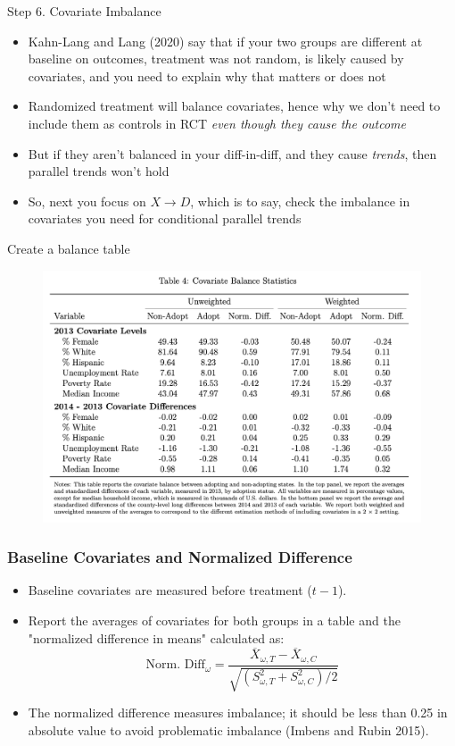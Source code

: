 \documentclass{beamer}
\begin{document}
\begin{frame}{Step 6. Covariate Imbalance}
    \begin{itemize}
	\item Kahn-Lang and Lang (2020) say that if your two groups are different at baseline on outcomes, treatment was not random, is likely caused by covariates, and you need to explain why that matters or does not
	\item Randomized treatment will balance covariates, hence why we don't need to include them as controls in RCT \emph{even though they cause the outcome}
	\item But if they aren't balanced in your diff-in-diff, and they cause \emph{trends}, then parallel trends won't hold
\item So, next you focus on $X \rightarrow D$, which is to say, check the imbalance in covariates you need for conditional parallel trends
\end{itemize}
\end{frame}



\begin{frame}{Create a balance table}

\begin{figure}
    \centering
    \includegraphics[height=0.80\textheight]{./lecture_includes/step6_imbalance}
\end{figure}

\end{frame}


\begin{frame}
    \frametitle{Baseline Covariates and Normalized Difference}
    \begin{itemize}
        \item Baseline covariates are measured before treatment ($t-1$). 
        \item Report the averages of covariates for both groups in a table and the "normalized difference in means" calculated as:
        $$ \text{Norm. Diff}_\omega = \frac{\overline{X}_{\omega,T} - \overline{X}_{\omega,C}}{\sqrt{(S_{\omega,T}^2 + S_{\omega,C}^2)/2}} $$
        \item The normalized difference measures imbalance; it should be less than 0.25 in absolute value to avoid problematic imbalance (Imbens and Rubin 2015).
    \end{itemize}
\end{frame}
\end{document}

